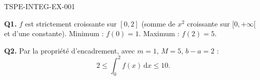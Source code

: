 \begin{corrige}{TSPE-INTEG-EX-001}

\textbf{Q1.} $f$ est strictement croissante sur $[0,2]$ (somme de $x^2$ croissante sur $[0,+\infty[$ et d'une constante). Minimum : $f(0)=1$. Maximum : $f(2)=5$.

\textbf{Q2.} Par la propriété d'encadrement, avec $m=1$, $M=5$, $b-a=2$ :
\[
  2 \leq \int_0^2 f(x)\,\mathrm{d}x \leq 10.
\]

\end{corrige}
